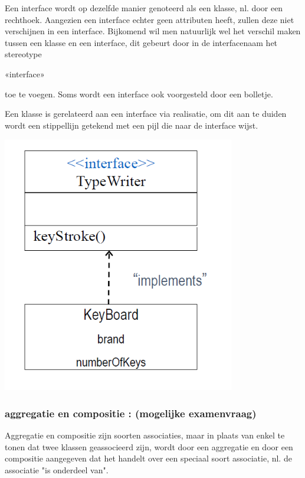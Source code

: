 Een interface wordt op dezelfde manier genoteerd als een klasse, nl. door een rechthoek. Aangezien een interface echter geen attributen heeft, zullen deze niet verschijnen in een interface.
Bijkomend wil men natuurlijk wel het verschil maken tussen een klasse en een interface, dit gebeurt door in de interfacenaam het stereotype

\begin{center}
«interface»
\end{center}

toe te voegen. Soms wordt een interface ook voorgesteld door een bolletje.

Een klasse is gerelateerd aan een interface via realisatie, om dit aan te duiden wordt een stippellijn getekend met een pijl die naar de interface wijst.


\begin{center}
\includegraphics[width=4in]{img/int2}%
\end{center}


\subsubsection{aggregatie en compositie : (mogelijke examenvraag)}

Aggregatie en compositie zijn soorten associaties, maar in plaats van enkel te tonen dat twee klassen geassocieerd zijn, wordt door een aggregatie en door een compositie aangegeven dat het handelt over een speciaal soort associatie, nl. de associatie "is onderdeel van".

